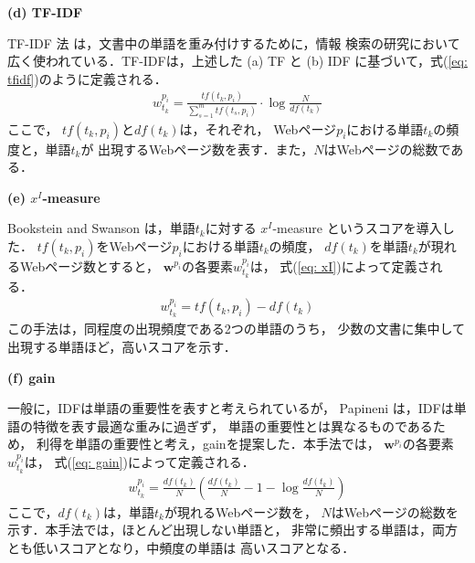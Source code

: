 \documentclass[japanese]{jnlp_1.4}
\begin{document}
\noindent
\textbf{(d) TF-IDF}

TF-IDF 法 \cite{Salton83} は，文書中の単語を重み付けするために，情報
検索の研究において広く使われている．TF-IDFは，上述した
(a) TF と (b) IDF に基づいて，式(\ref{eq: tfidf})のように定義される．
\begin{eqnarray}
 w_{t_{k}}^{p_{i}} = \frac{tf(t_{k}, p_{i})}{\sum_{s=1}^{m}tf(t_{s}, p_{i})}\cdot \log\frac{N}{df(t_{k})} \label{eq: tfidf}
\end{eqnarray}
ここで， $tf(t_{k}, p_{i})$と$df(t_{k})$は，それぞれ，
Webページ$p_{i}$における単語$t_{k}$の頻度と，単語$t_{k}$が
出現するWebページ数を表す．また，$N$はWebページの総数である．

\noindent
\textbf{(e) $x^{I}$-measure}

Bookstein and Swanson \cite{Bookstein74} は，単語$t_{k}$に対する
 $x^{I}$-measure というスコアを導入した．
$tf(t_{k}, p_{i})$をWebページ$p_{i}$における単語$t_{k}$の頻度，
$df(t_{k})$を単語$t_{k}$が現れるWebページ数とすると，
$\boldsymbol{w}^{p_{i}}$の各要素$w_{t_{k}}^{p_{i}}$は，
式(\ref{eq: xI})によって定義される．
\begin{eqnarray}
 w_{t_{k}}^{p_{i}}=tf(t_{k}, p_{i})-df(t_{k}) \label{eq: xI}
\end{eqnarray}
この手法は，同程度の出現頻度である2つの単語のうち，
少数の文書に集中して出現する単語ほど，高いスコアを示す．

\noindent
\textbf{(f) gain}

一般に，IDFは単語の重要性を表すと考えられているが，
Papineni \cite{Papineni01} は，IDFは単語の特徴を表す最適な重みに過ぎず，
単語の重要性とは異なるものであるため，
利得を単語の重要性と考え，gainを提案した．本手法では，
$\boldsymbol{w}^{p_{i}}$の各要素$w_{t_{k}}^{p_{i}}$は，
式(\ref{eq: gain})によって定義される．
\vspace{-0.5\baselineskip}
\begin{eqnarray}
 w_{t_{k}}^{p_{i}}=\frac{df(t_{k})}{N}\left(\frac{df(t_{k})}{N}-1-\log\frac{df(t_{k})}{N}\right) \label{eq: gain}
\end{eqnarray}
ここで，$df(t_{k})$は，単語$t_{k}$が現れるWebページ数を，
$N$はWebページの総数を示す．本手法では，ほとんど出現しない単語と，
非常に頻出する単語は，両方とも低いスコアとなり，中頻度の単語は
高いスコアとなる．
\end{document}

